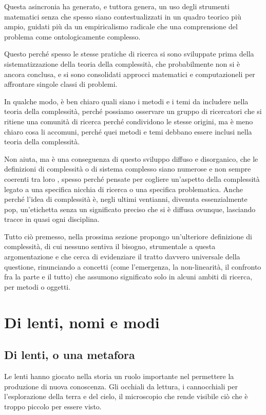 \documentclass[a4paper, headings=standardclasses]{scrartcl}
\begin{document}
Questa asincronia ha generato, e tuttora genera, un uso degli strumenti matematici senza che spesso siano contestualizzati in un quadro teorico più ampio, guidati più da un empiricalismo radicale che una comprensione del problema come ontologicamente complesso.

Questo perché spesso le stesse pratiche di ricerca si sono sviluppate prima della sistematizzazione della teoria della complessità, che probabilmente non si è ancora conclusa, e si sono consolidati approcci matematici e computazioneli per affrontare singole classi di problemi.

In qualche modo, è ben chiaro quali siano i metodi e i temi da includere nella teoria della complessità, perché possiamo osservare un gruppo di ricercatori che si ritiene una comunità di ricerca perché condividono le stesse origini, ma è meno chiaro cosa li accomuni, perché quei metodi e temi debbano essere inclusi nella teoria della complessità.

Non aiuta, ma è una conseguenza di questo sviluppo diffuso e disorganico, che le definizioni di complessità o di sistema complesso siano numerose e non sempre coerenti tra loro \parencite{holt2011}, spesso perché pensate per cogliere un'aspetto della complessità legato a una specifica nicchia di ricerca o una specifica problematica. Anche perché l'idea di complessità è, negli ultimi ventianni, divenuta essenzialmente pop, un'etichetta senza un significato preciso che si è diffusa ovunque, lasciando tracce in quasi ogni disciplina.

Tutto ciò premesso, nella prossima sezione propongo un'ulteriore definizione di complessità, di cui nessuno sentiva il bisogno, strumentale a questa argomentazione e che cerca di evidenziare il tratto davvero universale della questione, rinunciando a concetti (come l'emergenza, la non-linearità, il confronto fra la parte e il tutto) che assumono significato solo in alcuni ambiti di ricerca, per metodi o oggetti.

\section{Di lenti, nomi e modi}
\subsection{Di lenti, o una metafora}
Le lenti hanno giocato nella storia un ruolo importante nel permettere la produzione di nuova conoscenza. Gli occhiali da lettura, i cannocchiali per l'esplorazione della terra e del cielo, il microscopio che rende visibile ciò che è troppo piccolo per essere visto.
\end{document}
